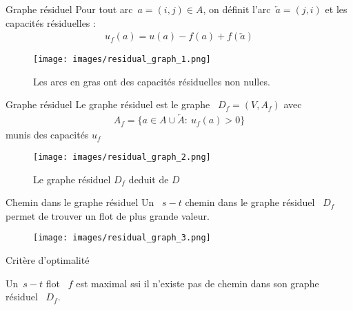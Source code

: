 \documentclass{beamer}
\begin{document}
\begin{frame}[t]{Graphe résiduel} \pause
  Pour tout arc~$a = (i, j) \in A$, on définit l'arc~$\overleftarrow{a} = (j, i)$  \pause et les capacités résiduelles :
  \begin{align*}
    u_f(a) = u(a) - f(a) +f\left(\overleftarrow{a}\right)
  \end{align*}

  \vfill \pause
  
  \begin{figure}
    \centering
    \texttt{[image: images/residual\_graph\_1.png]}
    \caption{Les arcs en gras ont des capacités résiduelles non nulles.}
  \end{figure}
\end{frame}

\begin{frame}[t]{Graphe résiduel} \pause
  Le graphe résiduel est le graphe ~$D_f = (V, A_f)$ avec
  \begin{align*}
    A_f = \{a \in A \cup \overleftarrow{A}:~ u_f(a) > 0\} 
  \end{align*}
  munis des capacités $u_f$
  
  \vfill \pause
  
  \begin{figure}
    \centering
    \texttt{[image: images/residual\_graph\_2.png]}
    \caption{Le graphe résiduel $D_f$ deduit de $D$}
  \end{figure}
\end{frame}

\begin{frame}[t]{Chemin dans le graphe résiduel}
  Un ~$s-t$ chemin dans le graphe résiduel ~$D_f$ permet de trouver un flot de plus grande valeur.
  
  \vfill \pause
  
  \begin{figure}
    \centering
    \texttt{[image: images/residual\_graph\_3.png]}
  \end{figure}
\end{frame}

\begin{frame}[t]{Critère d'optimalité} \pause
  \begin{theorem}[6.4]
    Un~$s-t$ flot ~$f$ est maximal ssi il n'existe pas de chemin dans son graphe résiduel ~$D_f$. 
  \end{theorem}
\end{frame}
\end{document}
